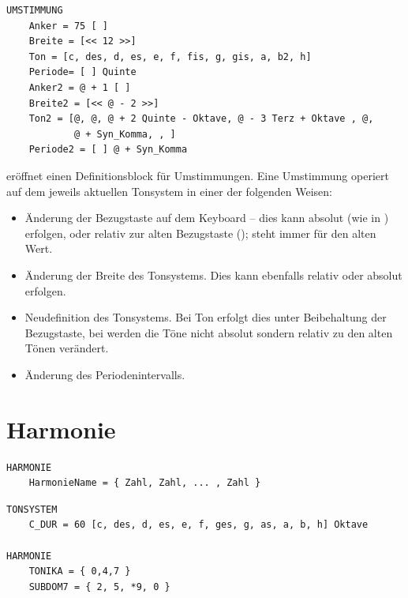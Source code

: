 {


\begin{verbatim}
UMSTIMMUNG
    Anker = 75 [ ] 
    Breite = [<< 12 >>] 
    Ton = [c, des, d, es, e, f, fis, g, gis, a, b2, h] 
    Periode= [ ] Quinte 
    Anker2 = @ + 1 [ ] 
    Breite2 = [<< @ - 2 >>] 
    Ton2 = [@, @, @ + 2 Quinte - Oktave, @ - 3 Terz + Oktave , @, 
            @ + Syn_Komma, , ] 
    Periode2 = [ ] @ + Syn_Komma
\end{verbatim}



 eröffnet einen Definitionsblock für Umstimmungen. 
Eine Umstimmung operiert auf dem jeweils aktuellen Tonsystem 
in einer der folgenden Weisen:

\begin{itemize}
\item Änderung der Bezugstaste auf dem Keyboard -- dies kann absolut
  (wie in ) erfolgen, oder relativ zur alten
  Bezugstaste (); \keyword{\@} steht immer für den alten Wert.
\item Änderung der Breite des Tonsystems. Dies kann ebenfalls relativ
  oder absolut erfolgen.
\item Neudefinition des Tonsystems. Bei Ton erfolgt dies unter
  Beibehaltung der Bezugstaste, bei  werden die Töne nicht absolut
  sondern relativ zu den alten Tönen verändert.
\item Änderung des Periodenintervalls.
\end{itemize}


\section{Harmonie}
\label{sec:SX_PATTERN}



\begin{verbatim}
HARMONIE
    HarmonieName = { Zahl, Zahl, ... , Zahl }
\end{verbatim}





\begin{verbatim}
TONSYSTEM
    C_DUR = 60 [c, des, d, es, e, f, ges, g, as, a, b, h] Oktave

HARMONIE 
    TONIKA = { 0,4,7 } 
    SUBDOM7 = { 2, 5, *9, 0 }
\end{verbatim}



}
